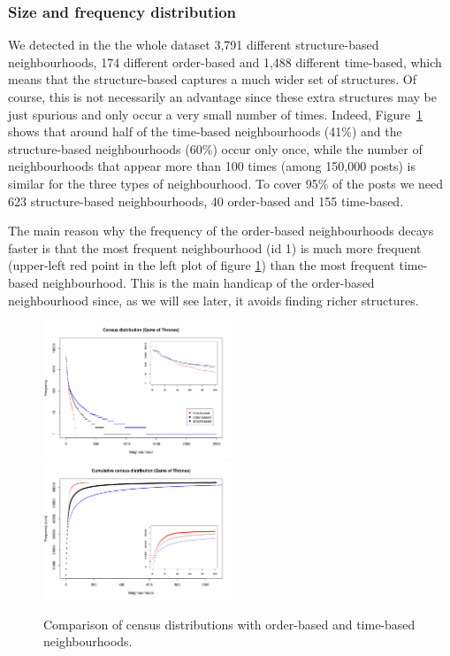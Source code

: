 \documentclass[conference]{IEEEtran}
\begin{document}
\subsubsection{Size and frequency distribution}
We detected in the the whole dataset 3,791 different structure-based neighbourhoods, 174 different order-based and 1,488 different time-based, which means that the structure-based captures a much wider set of structures. Of course, this is not necessarily an advantage since these extra structures may be just spurious and only occur a very small number of times. Indeed, Figure~\ref{fig:census_distributions} shows that around half of the time-based neighbourhoods (41\%) and the structure-based neighbourhoods (60\%) occur only once, while the number of neighbourhoods that appear more than 100 times (among 150,000 posts) is similar for the three types of neighbourhood. To cover 95\% of the posts we need 623 structure-based neighbourhoods, 40 order-based and 155 time-based. 
 
The main reason why the frequency of the order-based neighbourhoods decays faster is that the most frequent neighbourhood (id 1) is much more frequent (upper-left red point in the left plot of figure \ref{fig:census_distributions}) than the most frequent time-based neighbourhood. This is the main handicap of the order-based neighbourhood since, as we will see later, it avoids finding richer structures.

\begin{figure}
\centering
\includegraphics[width=0.5\textwidth]{compare_census_distribution_gameofthones}%
\includegraphics[width=0.5\textwidth]{compare_census_distribution_gameofthones_cum}
\caption{Comparison of census distributions with order-based and time-based neighbourhoods.}
\label{fig:census_distributions}
\end{figure}
\end{document}
